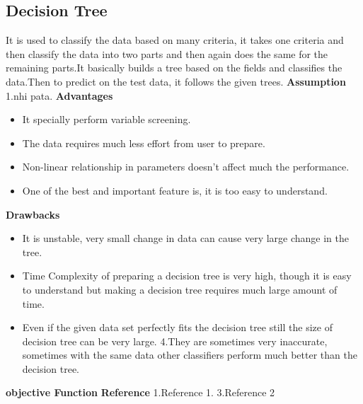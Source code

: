 \documentclass{article}
\begin{document}
\subsection{Decision Tree}
It is used to classify the data based on many criteria, it takes one criteria and then classify the data into two parts and then again does the same for the remaining parts.It basically builds a tree based on the fields and classifies the data.Then to predict on the test data, it follows the given trees.\newline
\textbf{Assumption}\newline
1.nhi pata.\newline
\textbf{Advantages}\newline
\begin{itemize}
\item It specially perform variable screening.
\item The data requires much less effort from user to prepare.
\item Non-linear relationship in parameters doesn't affect much the performance.
\item One of the best and important feature is, it is too easy to understand.
\end{itemize}
\textbf{Drawbacks}\newline
\begin{itemize}
\item It is unstable, very small change in data can cause very large change in the tree.
\item Time Complexity of preparing a decision tree is very high, though it is easy to understand but making a decision tree requires much large amount of time.
\item Even if the given data set perfectly fits the decision tree still the size of decision tree can be very large. 
4.They are sometimes very inaccurate, sometimes with the same data other classifiers perform much better than the decision tree. 
\end{itemize}
\textbf{objective Function}\newline
\textbf{Reference}\newline
1.Reference 1.\newline
3.Reference 2 \newline
\end{document}

